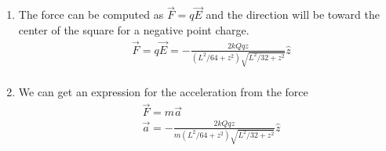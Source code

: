 {\begin{enumerate}
\begin{align*}
        &a=\frac{L}{4},\quad\lambda=\frac{Q}{L}\\
        &E_z=\frac{\frac{1}{2}kQ z}{(L^2/64+z^2)\sqrt{L^2/32+z^2}}\\
        &\answer{\vec{E}_\text{total}=4E_z\hat{z}=\frac{2kQ z}{(L^2/64+z^2)\sqrt{L^2/32+z^2}}\hat{z}}\\
    \end{align*}
    \item The force can be computed as $\vec{F}=q\vec{E}$ and the direction will be toward the center of the square for a negative point charge.
    \begin{align*}
        &\vec{F}=q\vec{E}=-\frac{2kQq z}{(L^2/64+z^2)\sqrt{L^2/32+z^2}}\hat{z}\\
    \end{align*}
    \item We can get an expression for the acceleration from the force
    \begin{align*}
        &\vec{F}=m\vec{a}\\
        &\vec{a}=-\frac{2kQq z}{m(L^2/64+z^2)\sqrt{L^2/32+z^2}}\hat{z}\\
    \end{align*}
\end{enumerate}
}{}
